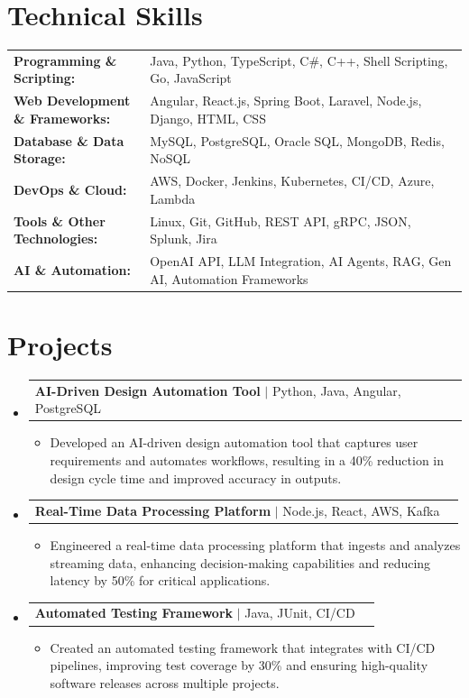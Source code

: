 \documentclass[letterpaper,10pt]{article}
\makeatletter
\newcommand{\resumeItem}[1]{
  \item{\fontsize{8pt}{9pt}\selectfont
    #1 \vspace{-3pt}
  }
}
\newcommand{\resumeProjectHeading}[2]{
    \item
    \begin{tabular*}{1.001\textwidth}{l@{\extracolsep{\fill}}r}
      \fontsize{8.5pt}{10pt}#1 & \textbf{\fontsize{8.5pt}{10pt} #2}\\
    \end{tabular*}\vspace{-7pt}
}
\newcommand{\resumeSubHeadingListStart}{\begin{itemize}[leftmargin=0pt, label={}]}
\newcommand{\resumeSubHeadingListEnd}{\end{itemize}}
\newcommand{\resumeItemListStart}{\begin{itemize}[leftmargin=*]}
\newcommand{\resumeItemListEnd}{\end{itemize}\vspace{-5pt}}
\makeatother
\begin{document}
\section{Technical Skills}
        \vspace{-14pt}
        \begin{table}[h]
            \fontsize{8pt}{9pt}\selectfont
            \begin{tabular}{p{0.3\linewidth} p{0.7\linewidth}}
                \textbf{Programming \& Scripting:} & Java, Python, TypeScript, C\#, C++, Shell Scripting, Go, JavaScript \\
                \textbf{Web Development \& Frameworks:} & Angular, React.js, Spring Boot, Laravel, Node.js, Django, HTML, CSS \\
                \textbf{Database \& Data Storage:} & MySQL, PostgreSQL, Oracle SQL, MongoDB, Redis, NoSQL \\
                \textbf{DevOps \& Cloud:} & AWS, Docker, Jenkins, Kubernetes, CI/CD, Azure, Lambda \\
                \textbf{Tools \& Other Technologies:} & Linux, Git, GitHub, REST API, gRPC, JSON, Splunk, Jira \\
                \textbf{AI \& Automation:} & OpenAI API, LLM Integration, AI Agents, RAG, Gen AI, Automation Frameworks \\
            \end{tabular}
        \end{table}
 \vspace{-18pt}

\section{Projects}
    \vspace{-5pt}
    \resumeSubHeadingListStart
          \resumeProjectHeading
            {\textbf{AI-Driven Design Automation Tool} $|$ Python, Java, Angular, PostgreSQL}{}
            \resumeItemListStart
                \resumeItem{Developed an AI-driven design automation tool that captures user requirements and automates workflows, resulting in a 40\% reduction in design cycle time and improved accuracy in outputs.}
            \resumeItemListEnd
        \vspace{-12pt}
    
        \resumeProjectHeading
            {\textbf{Real-Time Data Processing Platform} $|$ Node.js, React, AWS, Kafka}{}
        \resumeItemListStart
                \resumeItem{Engineered a real-time data processing platform that ingests and analyzes streaming data, enhancing decision-making capabilities and reducing latency by 50\% for critical applications.}
        \resumeItemListEnd
      \vspace{-12pt}
      \resumeProjectHeading
        {\textbf{Automated Testing Framework} $|$ Java, JUnit, CI/CD}{}
    \resumeItemListStart
            \resumeItem{Created an automated testing framework that integrates with CI/CD pipelines, improving test coverage by 30\% and ensuring high-quality software releases across multiple projects.}
    \resumeItemListEnd
    \resumeSubHeadingListEnd
\end{document}
